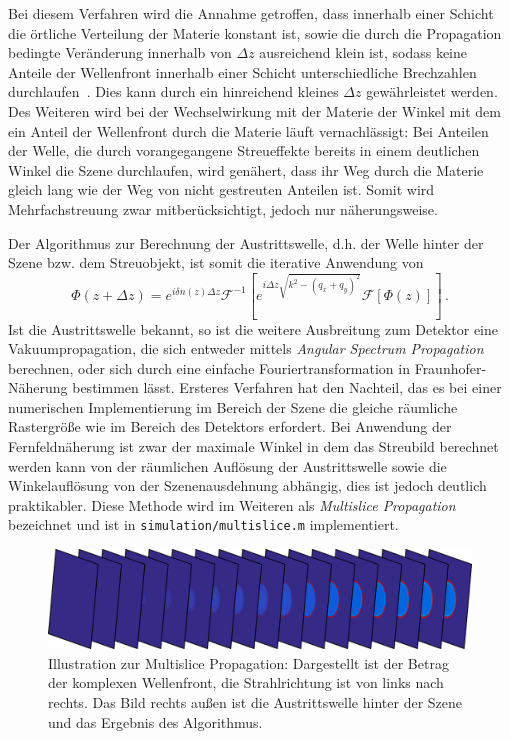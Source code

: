 Bei diesem Verfahren wird die Annahme getroffen, dass  innerhalb einer Schicht die örtliche Verteilung der Materie konstant ist, sowie die durch die Propagation bedingte Veränderung innerhalb von $\Delta z$ ausreichend klein ist, sodass keine Anteile der Wellenfront innerhalb einer Schicht unterschiedliche Brechzahlen durchlaufen~\cite{hare1994}. Dies kann durch ein hinreichend kleines $\Delta z$ gewährleistet werden. 
Des Weiteren wird bei der Wechselwirkung mit der Materie der Winkel mit dem ein Anteil der Wellenfront durch die Materie läuft vernachlässigt: Bei Anteilen der Welle, die durch vorangegangene Streueffekte bereits in einem deutlichen Winkel die Szene durchlaufen, wird genähert, dass ihr Weg durch die Materie gleich lang wie der Weg von nicht gestreuten Anteilen ist. Somit wird Mehrfachstreuung zwar mitberücksichtigt, jedoch nur näherungsweise.
	
Der Algorithmus zur Berechnung der Austrittswelle, d.h. der Welle hinter der Szene bzw. dem Streuobjekt, ist somit die iterative Anwendung von
\begin{equation}
	\label{eq:multislice}
	\Phi(z+\Delta z)= e^{i\delta n\left(z\right) \Delta z}\mathscr{F}^{-1}\left[e^{i\Delta z\sqrt{k^2-(q_x+q_y)^2}}\mathscr{F}\left[\Phi(z)\right]\right] \,.
\end{equation}
Ist die Austrittswelle bekannt, so ist die weitere Ausbreitung zum Detektor eine Vakuumpropagation, die sich entweder mittels \textit{Angular Spectrum Propagation} berechnen, oder sich durch eine einfache Fouriertransformation in Fraunhofer-Näherung bestimmen lässt. Ersteres Verfahren hat den Nachteil, das es bei einer numerischen Implementierung im Bereich der Szene die gleiche räumliche Rastergröße wie im Bereich des Detektors erfordert. Bei Anwendung der Fernfeldnäherung ist zwar der maximale Winkel in dem das Streubild berechnet werden kann von der räumlichen Auflösung der Austrittswelle sowie die Winkelauflösung von der Szenenausdehnung abhängig, dies ist jedoch deutlich praktikabler.
Diese Methode wird im Weiteren als \textit{Multislice Propagation} bezeichnet und ist in \texttt{simulation/multislice.m} implementiert.

\begin{figure}
	\centering
	\includegraphics[width=1\textwidth]{images/slice_multislice.png}
	\caption[Illustration Multislice Propagation]{Illustration zur Multislice Propagation: Dargestellt ist der Betrag der komplexen Wellenfront, die Strahlrichtung ist von links nach rechts. Das Bild rechts außen ist die Austrittswelle hinter der Szene und das Ergebnis des Algorithmus.}
	\label{fig:msft}
\end{figure} 
	

